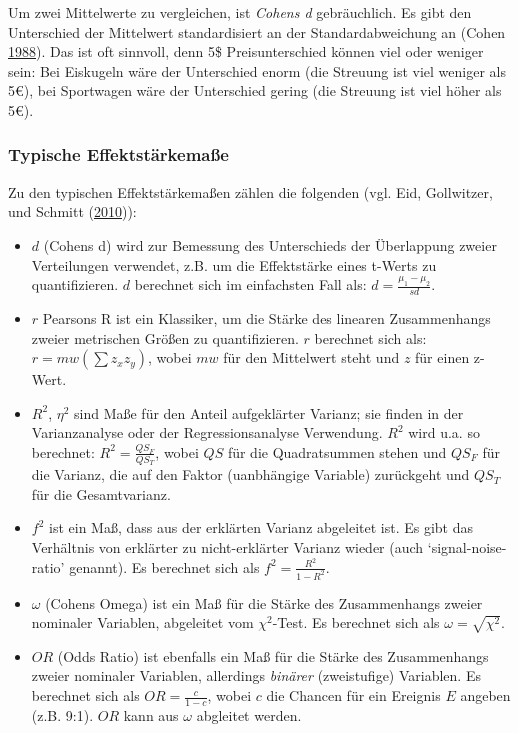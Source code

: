 \documentclass[12pt,ngerman,]{book}
\newcommand{\euro}{€}
\providecommand{\tightlist}{%
  \setlength{\itemsep}{0pt}\setlength{\parskip}{0pt}}
\theoremstyle{definition}
\theoremstyle{definition}
\theoremstyle{remark}
\begin{document}
Um zwei Mittelwerte zu vergleichen, ist \emph{Cohens d}
gebräuchlich. Es gibt den Unterschied der Mittelwert standardisiert an
der Standardabweichung an (Cohen
\protect\hyperlink{ref-cohen_statistical_1988}{1988}). Das ist oft
sinnvoll, denn 5\$ Preisunterschied können viel oder weniger sein: Bei
Eiskugeln wäre der Unterschied enorm (die Streuung ist viel weniger als
5\euro{}), bei Sportwagen wäre der Unterschied gering (die Streuung ist
viel höher als 5\euro{}).

\subsubsection{Typische
Effektstärkemaße}\label{typische-effektstarkemae}

Zu den typischen Effektstärkemaßen zählen die folgenden (vgl. Eid,
Gollwitzer, und Schmitt
(\protect\hyperlink{ref-eid2010statistik}{2010})):

\begin{itemize}
\tightlist
\item
  \(d\) (Cohens d) wird zur Bemessung des Unterschieds der Überlappung
  zweier Verteilungen verwendet, z.B. um die Effektstärke eines t-Werts
  zu quantifizieren. \(d\) berechnet sich im einfachsten Fall als:
  \(d = \frac{\mu_1 - \mu_2}{sd}\).
\item
  \(r\) Pearsons R ist ein Klassiker, um die Stärke des linearen
  Zusammenhangs zweier metrischen Größen zu quantifizieren. \(r\)
  berechnet sich als: \(r = mw(\sum z_x z_y)\), wobei \(mw\) für den
  Mittelwert steht und \(z\) für einen z-Wert.
\item
  \(R^2\), \(\eta^2\) sind Maße für den Anteil aufgeklärter Varianz; sie
  finden in der Varianzanalyse oder der Regressionsanalyse Verwendung.
  \(R^2\) wird u.a. so berechnet: \(R^2 = \frac{QS_F}{QS_T}\), wobei
  \(QS\) für die Quadratsummen stehen und \(QS_F\) für die Varianz, die
  auf den Faktor (uanbhängige Variable) zurückgeht und \(QS_T\) für die
  Gesamtvarianz.
\item
  \(f^2\) ist ein Maß, dass aus der erklärten Varianz abgeleitet ist. Es
  gibt das Verhältnis von erklärter zu nicht-erklärter Varianz wieder
  (auch `signal-noise-ratio' genannt). Es berechnet sich als
  \(f^2 = \frac{R^2}{1-R^2}\).
\item
  \(\omega\) (Cohens Omega) ist ein Maß für die Stärke des Zusammenhangs
  zweier nominaler Variablen, abgeleitet vom \(\chi^2\)-Test. Es
  berechnet sich als \(\omega = \sqrt{\chi^2}\).
\item
  \(OR\) (Odds Ratio) ist ebenfalls ein Maß für die Stärke des
  Zusammenhangs zweier nominaler Variablen, allerdings \emph{binärer}
  (zweistufige) Variablen. Es berechnet sich als \(OR = \frac{c}{1-c}\),
  wobei \(c\) die Chancen für ein Ereignis \(E\) angeben (z.B. 9:1).
  \(OR\) kann aus \(\omega\) abgleitet werden.
\end{itemize}
\end{document}
